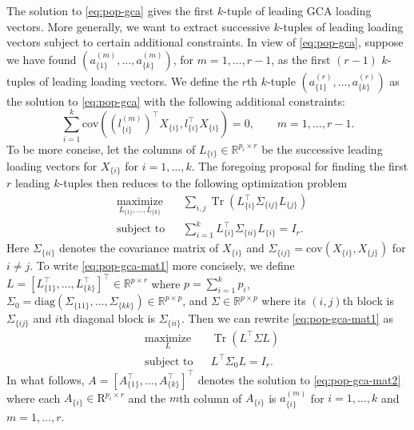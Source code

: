 \documentclass[11pt]{article}
\newcommand{\dc}[1]{\{#1\}} %
\DeclareMathOperator{\Tr}{Tr}
\newcommand{\0}{{\mathbf{0}}}
\begin{document}
 
The solution to \eqref{eq:pop-gca} gives the first $k$-tuple of leading GCA loading vectors. 
More generally, we want to extract successive $k$-tuples of leading loading vectors subject to certain additional
constraints.
In view of \eqref{eq:pop-gca}, suppose we have found $({ a_{\dc{1}}^{(m)}}, \dots, {a_{\dc{k}}^{(m)}})$, 
 for $m=1,\dots, r-1$, as the first $(r-1)$ $k$-tuples of leading loading vectors. 
We define the $r$th $k$-tuple $({a_{\dc{1}}^{(r)}}, \dots, {a_{\dc{k}}^{(r)}})$ as the solution to \eqref{eq:pop-gca} with the following additional constraints:
\begin{equation*}
      \sum_{i=1}^k \text{cov}(({l_{\dc{i}}^{(m)}})^\top  X_{ \dc{i}}, {l_{\dc{i}}^\top}  X_{\dc{i}}) = 0, \qquad
      m = 1,\dots, r-1.
\end{equation*}
To be more concise, let the columns of $L_{\dc{i}}\in \mathbb{R}^{p_i\times r}$ 
be the successive leading loading vectors for $X_{\dc{i}}$ for $i=1,\dots, k$.
The foregoing proposal for finding the first $r$ 
leading $k$-tuples then reduces to the following optimization problem
\begin{equation}
      \label{eq:pop-gca-mat1}
\begin{aligned}
& \underset{L_{\dc{1}},\dots, L_{\dc{k}}}{\text{maximize}}
& & \sum_{i,j}\Tr({L_{\dc{i}}^\top \Sigma_{\dc{ij}} L_{\dc{j}}}) \\
& \text{subject to}
& & \sum_{i=1}^k {L_{\dc{i}}^\top \Sigma_{\dc{ii}}L_{\dc{i}}}=I_r.
\end{aligned}
\end{equation}
Here $\Sigma_{\dc{ii}}$ 
denotes the covariance matrix of $X_{\dc{i}}$ and $\Sigma_{{\dc{ij}}}=\text{cov}(X_{\dc{i}},X_{\dc{j}})$ for $i\neq j$. 
To write \eqref{eq:pop-gca-mat1} more concisely, we define 
$L = [{ L_{\dc{1}}^\top} ,\dots, { L_{\dc{k}}^\top} ]^\top  \in \mathbb{R}^{p\times r}$ 
where $p = \sum_{i=1}^k p_i$, 
$\Sigma_0 = \mathrm{diag}(\Sigma_{\dc{11}},\dots, \Sigma_{\dc{kk}})\in \mathbb{R}^{p\times p}$, and $\Sigma \in \mathbb{R}^{p\times p}$ where its $(i,j)$th block is $\Sigma_{ \dc{ij}}$ and $i$th diagonal block is $\Sigma_{\dc{ii}}$.
Then we can rewrite \eqref{eq:pop-gca-mat1} as 
\begin{equation}
      \label{eq:pop-gca-mat2}
\begin{aligned}
& \underset{L}{\text{maximize}}
& & \Tr(L^\top \Sigma L) \\
& \text{subject to}
& & L^\top \Sigma_0L=I_r. 
\end{aligned}
\end{equation}
In what follows, $A = [{ A_{\dc{1}}^\top},\dots, { A_{\dc{k}}^\top}]^\top$ denotes the solution to \eqref{eq:pop-gca-mat2} where each $A_{\dc{i}}\in \mathrm{R}^{p_i\times r}$ and the $m$th column of $A_{\dc{i}}$ is $a^{(m)}_{\dc{i}}$ for $i=1,\dots,k$ and $m=1,\dots,r$.
\end{document}
